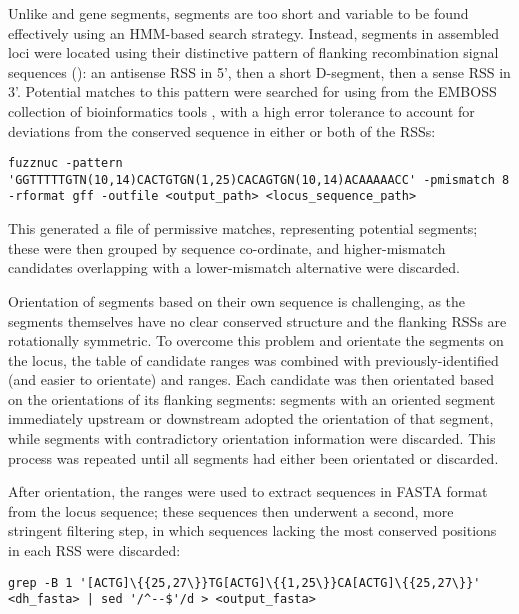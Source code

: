 \subsubsubsection{\dh}

\noindent Unlike \vh and \jh gene segments, \dh segments are too short and variable to be found effectively using an HMM-based search strategy. Instead, \dh segments in assembled loci were located using their distinctive pattern of flanking recombination signal sequences (): an antisense RSS in 5', then a short D-segment, then a sense RSS in 3'. Potential matches to this pattern were searched for using  from the EMBOSS collection of bioinformatics tools \parencite{rice2000emboss}, with a high error tolerance to account for deviations from the conserved sequence in either or both of the RSSs:

\begin{lstlisting}
fuzznuc -pattern 'GGTTTTTGTN(10,14)CACTGTGN(1,25)CACAGTGN(10,14)ACAAAAACC' -pmismatch 8 -rformat gff -outfile <output_path> <locus_sequence_path>
\end{lstlisting}

\noindent This generated a  file of permissive matches, representing potential \dh segments; these were then grouped by sequence co-ordinate, and higher-mismatch candidates overlapping with a lower-mismatch alternative were discarded.

Orientation of \dh segments based on their own sequence is challenging, as the segments themselves have no clear conserved structure and the flanking RSSs are rotationally symmetric. To overcome this problem and orientate the \dh segments on the locus, the table of \dh candidate ranges was combined with previously-identified (and easier to orientate) \vh and \jh ranges. Each \dh candidate was then orientated based on the orientations of its flanking segments: segments with an oriented segment immediately upstream or downstream adopted the orientation of that segment, while segments with contradictory orientation information were discarded. This process was repeated until all \dh segments had either been orientated or discarded.

After orientation, the \dh ranges were used to extract \dh sequences in FASTA format from the locus sequence; these sequences then underwent a second, more stringent filtering step, in which sequences lacking the most conserved positions in each RSS \parencite{hesse1989rss} were discarded:

\begin{lstlisting}
grep -B 1 '[ACTG]\{{25,27\}}TG[ACTG]\{{1,25\}}CA[ACTG]\{{25,27\}}' <dh_fasta> | sed '/^--$'/d > <output_fasta>
\end{lstlisting}

